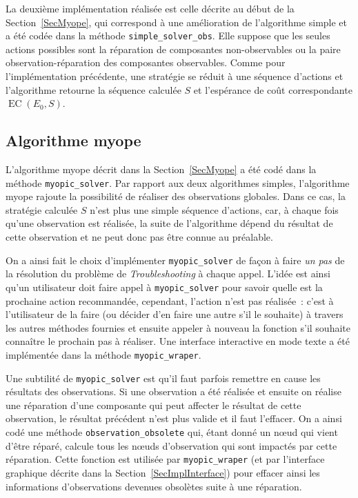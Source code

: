 \documentclass[a4paper,11pt]{article}
\theoremstyle{plain}
\theoremstyle{definition}
\DeclareMathOperator{\EC}{EC}
\begin{document}
La deuxième implémentation réalisée est celle décrite au début de la Section~\ref{SecMyope}, qui correspond à une amélioration de l'algorithme simple et a été codée dans la méthode \texttt{simple\_solver\_\allowbreak{}obs}. Elle suppose que les seules actions possibles sont la réparation de composantes non-ob\-ser\-vables ou la paire observation-réparation des composantes observables. Comme pour l'implémentation précédente, une stratégie se réduit à une séquence d'actions et l'algorithme retourne la séquence calculée $S$ et l'espérance de coût correspondante $\EC(E_0, S)$.

\subsection{Algorithme myope}
\label{SecImplMyope}

L'algorithme myope décrit dans la Section~\ref{SecMyope} a été codé dans la méthode \texttt{myopic\_solver}. Par rapport aux deux algorithmes simples, l'algorithme myope rajoute la possibilité de réaliser des observations globales. Dans ce cas, la stratégie calculée $S$ n'est plus une simple séquence d'actions, car, à chaque fois qu'une observation est réalisée, la suite de l'algorithme dépend du résultat de cette observation et ne peut donc pas être connue au préalable.

On a ainsi fait le choix d'implémenter \texttt{myopic\_solver} de façon à faire \emph{un pas} de la résolution du problème de \emph{Troubleshooting} à chaque appel. L'idée est ainsi qu'un utilisateur doit faire appel à \texttt{myopic\_solver} pour savoir quelle est la prochaine action recommandée, cependant, l'action n'est pas réalisée~: c'est à l'utilisateur de la faire (ou décider d'en faire une autre s'il le souhaite) à travers les autres méthodes fournies et ensuite appeler à nouveau la fonction s'il souhaite connaître le prochain pas à réaliser. Une interface interactive en mode texte a été implémentée dans la méthode \texttt{myopic\_wraper}.

Une subtilité de \texttt{myopic\_solver} est qu'il faut parfois remettre en cause les résultats des observations. Si une observation a été réalisée et ensuite on réalise une réparation d'une composante qui peut affecter le résultat de cette observation, le résultat précédent n'est plus valide et il faut l'effacer. On a ainsi codé une méthode \texttt{observation\_obsolete} qui, étant donné un nœud qui vient d'être réparé, calcule tous les nœuds d'observation qui sont impactés par cette réparation. Cette fonction est utilisée par \texttt{myopic\_wraper} (et par l'interface graphique décrite dans la Section~\ref{SecImplInterface}) pour effacer ainsi les informations d'observations devenues obsolètes suite à une réparation.
\end{document}
